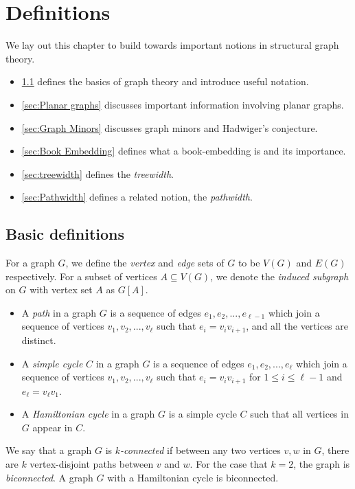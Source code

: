 \chapter{Definitions}\label{chap:Definitions}
We lay out this chapter to build towards important notions in structural graph theory.

\begin{itemize}
	\item \cref{sec: Basic definitions} defines the basics of graph theory and introduce useful notation.
	\item \cref{sec:Planar graphs} discusses important information involving planar graphs. 
	\item \cref{sec:Graph Minors} discusses graph minors and Hadwiger's conjecture.
	\item \cref{sec:Book Embedding} defines what a book-embedding is and its importance. 
	\item \cref{sec:treewidth} defines the \textit{treewidth}.
	\item \cref{sec:Pathwidth} defines a related notion, the \textit{pathwidth}.
\end{itemize}
\section{Basic definitions}\label{sec: Basic definitions}
For a graph $G$, we define the \textit{vertex} and \textit{edge} sets of $G$ to be $V(G)$ and $E(G)$ respectively.
For a subset of vertices $A \subseteq V(G)$, we denote the \textit{induced subgraph} on $G$ with vertex set $A$ as $G[A]$. 

\begin{itemize}
	\item A \textit{path} in a graph $G$ is a sequence of edges $e_1, e_2, ..., e_{\ell- 1}$ which join a sequence of vertices $v_1, v_2, ..., v_{\ell}$ such that $e_i = v_iv_{i + 1}$, and all the vertices are distinct. 
	\item A \textit{simple cycle} $C$ in a graph $G$ is a sequence of edges $e_1, e_2, ..., e_{\ell}$ which join a sequence of vertices $v_1, v_2, ..., v_{\ell}$ such that $e_i = v_iv_{i + 1}$ for $1 \leq i \leq \ell - 1$ and $e_\ell = v_\ell v_1$. 
	\item A \textit{Hamiltonian cycle} in a graph $G$ is a simple cycle $C$ such that all vertices in $G$ appear in $C$.
\end{itemize}

We say that a graph $G$ is \textit{$k$-connected} if between any two vertices $v, w$ in $G$, there are $k$ vertex-disjoint paths between $v$ and $w$. For the case that $k = 2$, the graph is \textit{biconnected}. A graph $G$ with a Hamiltonian cycle is biconnected. 

